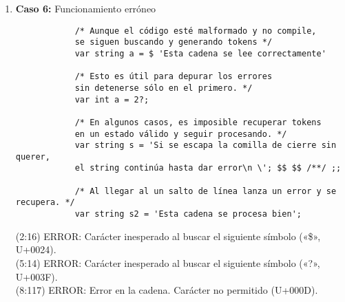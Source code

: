 \documentclass{article}
\begin{document}
\begin{enumerate}
    \newpage
    
    \item \textbf{Caso 6:} Funcionamiento erróneo
    \begin{tcolorbox}[title={Código fuente}, colback=white]
        \begin{lstlisting}
            /* Aunque el código esté malformado y no compile, 
            se siguen buscando y generando tokens */
            var string a = $ 'Esta cadena se lee correctamente'
            
            /* Esto es útil para depurar los errores 
            sin detenerse sólo en el primero. */
            var int a = 2?;
            
            /* En algunos casos, es imposible recuperar tokens 
            en un estado válido y seguir procesando. */
            var string s = 'Si se escapa la comilla de cierre sin querer, 
            el string continúa hasta dar error\n \'; $$ $$ /**/ ;;
            
            /* Al llegar al un salto de línea lanza un error y se recupera. */
            var string s2 = 'Esta cadena se procesa bien';
        \end{lstlisting}      
    \end{tcolorbox}

    \begin{tcolorbox}[title={Errores detectados}, colback=white]
        (2:16) ERROR: Carácter inesperado al buscar el siguiente símbolo («\$», U+0024).\\
        (5:14) ERROR: Carácter inesperado al buscar el siguiente símbolo («?», U+003F).\\
        (8:117) ERROR: Error en la cadena. Carácter no permitido (U+000D).
    \end{tcolorbox}
\end{enumerate}
\end{document}
